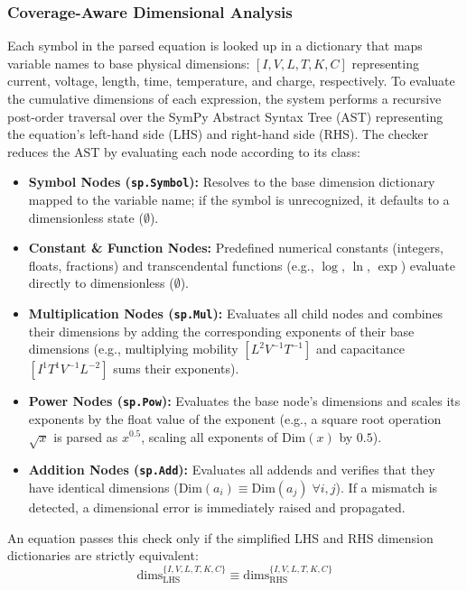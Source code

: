 \documentclass[a4paper,fleqn]{cas-sc}
\begin{document}
\subsubsection{Coverage-Aware Dimensional Analysis}
Each symbol in the parsed equation is looked up in a dictionary that maps variable names to base physical dimensions: $[I, V, L, T, K, C]$ representing current, voltage, length, time, temperature, and charge, respectively. To evaluate the cumulative dimensions of each expression, the system performs a recursive post-order traversal over the SymPy Abstract Syntax Tree (AST) representing the equation's left-hand side (LHS) and right-hand side (RHS). The checker reduces the AST by evaluating each node according to its class:
\begin{itemize}
    \item \textbf{Symbol Nodes (\texttt{sp.Symbol}):} Resolves to the base dimension dictionary mapped to the variable name; if the symbol is unrecognized, it defaults to a dimensionless state ($\emptyset$).
    \item \textbf{Constant \& Function Nodes:} Predefined numerical constants (integers, floats, fractions) and transcendental functions (e.g., $\log$, $\ln$, $\exp$) evaluate directly to dimensionless ($\emptyset$).
    \item \textbf{Multiplication Nodes (\texttt{sp.Mul}):} Evaluates all child nodes and combines their dimensions by adding the corresponding exponents of their base dimensions (e.g., multiplying mobility $[L^2 V^{-1} T^{-1}]$ and capacitance $[I^1 T^1 V^{-1} L^{-2}]$ sums their exponents).
    \item \textbf{Power Nodes (\texttt{sp.Pow}):} Evaluates the base node's dimensions and scales its exponents by the float value of the exponent (e.g., a square root operation $\sqrt{x}$ is parsed as $x^{0.5}$, scaling all exponents of $\text{Dim}(x)$ by $0.5$).
    \item \textbf{Addition Nodes (\texttt{sp.Add}):} Evaluates all addends and verifies that they have identical dimensions ($\text{Dim}(a_i) \equiv \text{Dim}(a_j) \; \forall i, j$). If a mismatch is detected, a dimensional error is immediately raised and propagated.
\end{itemize}
An equation passes this check only if the simplified LHS and RHS dimension dictionaries are strictly equivalent:
\begin{equation*}
\mathrm{dims}_{\mathrm{LHS}}^{\{I,V,L,T,K,C\}}
\equiv
\mathrm{dims}_{\mathrm{RHS}}^{\{I,V,L,T,K,C\}}
\end{equation*}
\end{document}
